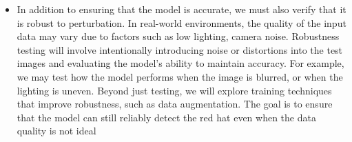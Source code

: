 \begin{itemize}
    \item In addition to ensuring that the model is accurate, we must also verify that it is robust to perturbation. 
    In real-world environments, the quality of the input data may vary due to factors such as low lighting, camera noise. 
    Robustness testing will involve intentionally introducing noise or distortions into the test images and evaluating the model’s ability to maintain accuracy. 
    For example, we may test how the model performs when the image is blurred, or when the lighting is uneven. 
    Beyond just testing, we will explore training techniques that improve robustness, such as data augmentation. 
    The goal is to ensure that the model can still reliably detect the red hat even when the data quality is not ideal
\end{itemize}